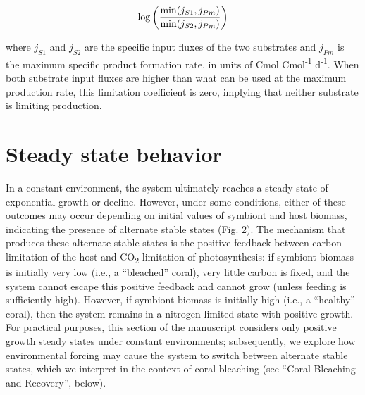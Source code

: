 \documentclass[]{elsarticle} %
\begin{document}
\begin{equation} \log \bigg({{\min(j_{S1}, j_{Pm})} \over {\min(j_{S2}, j_{Pm})}}\bigg) \end{equation}

where \(j_{S1}\) and \(j_{S2}\) are the specific input fluxes of the two
substrates and \(j_{Pm}\) is the maximum specific product formation
rate, in units of Cmol Cmol\textsuperscript{-1} d\textsuperscript{-1}.
When both substrate input fluxes are higher than what can be used at the
maximum production rate, this limitation coefficient is zero, implying
that neither substrate is limiting production.

\section{Steady state behavior}\label{steady-state-behavior}

In a constant environment, the system ultimately reaches a steady state
of exponential growth or decline. However, under some conditions, either
of these outcomes may occur depending on initial values of symbiont and
host biomass, indicating the presence of alternate stable states (Fig.
2). The mechanism that produces these alternate stable states is the
positive feedback between carbon-limitation of the host and
CO\textsubscript{2}-limitation of photosynthesis: if symbiont biomass is
initially very low (i.e., a ``bleached'' coral), very little carbon is
fixed, and the system cannot escape this positive feedback and cannot
grow (unless feeding is sufficiently high). However, if symbiont biomass
is initially high (i.e., a ``healthy'' coral), then the system remains
in a nitrogen-limited state with positive growth. For practical
purposes, this section of the manuscript considers only positive growth
steady states under constant environments; subsequently, we explore how
environmental forcing may cause the system to switch between alternate
stable states, which we interpret in the context of coral bleaching (see
``Coral Bleaching and Recovery'', below).
\end{document}
